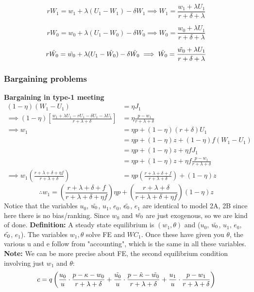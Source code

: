 \documentclass[12pt]{article} %
\theoremstyle{definition}
\begin{document}
\begin{equation}
    rW_1 =w_1+\lambda(U_1-W_1)- \delta W_1 \implies W_1 = \frac{w_1 + \lambda U_1}{r + \delta + \lambda}
\end{equation}

\begin{equation}
    rW_0 =w_0+\lambda(U_1-W_0)- \delta W_0 \implies W_0 = \frac{w_0 + \lambda U_1}{r + \delta + \lambda}
\end{equation}

\begin{equation}
    r\Tilde{W_0} =\Tilde{w_0}+\lambda(U_1-\Tilde{W_0})- \delta \Tilde{W_0} \implies \Tilde{W_0} = \frac{\Tilde{w_0} + \lambda U_1}{r + \delta + \lambda}
\end{equation}

\subsubsection{Bargaining problems}
\textbf{Bargaining in type-1 meeting}
\begin{align*}
    (1-\eta)(W_1-U_1) &= \eta J_1 \\
     \implies (1-\eta) \left[ \frac{w_1 + \lambda U_1 - rU_1-\delta U_1 - \lambda U_1}{r+\lambda + \delta}\right] &= \eta \frac{p-w_1}{r+\lambda+\delta} \\
    \implies w_1 &= \eta p + (1-\eta)(r+\delta)U_1 \\
   &= \eta p + (1-\eta)z + (1-\eta)f(W_1-U_1) \\
   &= \eta p + (1-\eta)z + \eta f J_1 \\
   &= \eta p + (1-\eta)z + \eta f \frac{p-w_1}{r+\lambda +\delta} \\ 
   \implies w_1\left(\frac{r+\lambda+\delta+\eta f}{r+\lambda+\delta}\right) &= \eta p \left(\frac{r+\lambda+\delta+f}{r+\lambda+\delta}\right) + (1-\eta)z
\end{align*}
\begin{equation}
    \therefore w_1 = \left(\frac{r+\lambda+\delta+f}{r+\lambda+\delta+\eta f}\right) \eta p + \left(\frac{r+\lambda+\delta}{r+\lambda+\delta+\eta f}\right) (1-\eta)z
\end{equation}
Notice that the variables $u_0$, $\Tilde{u_0}$, $u_1$, $e_0$, $\Tilde{e_0}$, $e_1$ are identical to model 2A, 2B since here there is no bias/ranking. Since $w_0$ and $\Tilde{w_0}$ are just exogenous, so we are kind of done. 
\textbf{Definition:} A steady state equilibrium is $(w_1,\theta)$ and ($u_0$, $\Tilde{u_0}$, $u_1$, $e_0$, $\Tilde{e_0}$, $e_1$). The variables $w_1, \theta$ solve FE and ${WC}_1$. Once these have given you $\theta$, the various u and e follow from "accounting", which is the same in all these variables. \\
\textbf{Note:} We can be more precise about FE, the second equilibrium condition involving just $w_1$ and $\theta$:
$$c=q\left(\frac{u_0}{u}\cdot \frac{p-\kappa-w_0}{r+\lambda+\delta}+\frac{\Tilde{u_0}}{u}\cdot \frac{p-\Tilde{\kappa}-\Tilde{w_0}}{r+\lambda+\delta}+\frac{u_1}{u}\cdot \frac{p-w_1}{r+\lambda+\delta}\right)$$



\setlength{\bibsep}{0pt}
%


\end{document}
